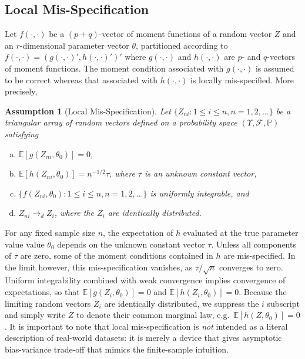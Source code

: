 \documentclass[12pt]{article}
\newcommand{\p}{\mathbb{P}}
\newcommand{\expect}{\mathbb{E}}
\newtheorem{assump}{Assumption}[section]
\theoremstyle{definition}
\begin{document}
\subsection{Local Mis-Specification}
Let $f(\cdot,\cdot)$ be a $(p+q)$-vector of moment functions of a random vector $Z$ and an $r$-dimensional parameter vector $\theta$, partitioned according to $f(\cdot,\cdot) = \left(g(\cdot,\cdot)', h(\cdot,\cdot)'  \right)'$ where $g(\cdot,\cdot)$ and $h(\cdot,\cdot)$ are $p$- and $q$-vectors of moment functions. The moment condition associated with $g(\cdot,\cdot)$ is assumed to be correct whereas that associated with $h(\cdot,\cdot)$ is locally mis-specified. More precisely,
\begin{assump}[Local Mis-Specification]
\label{assump:drift}
Let $\{Z_{ni}\colon 1\leq i \leq n, n =1, 2, \hdots\}$ be a triangular array of random vectors defined on a probability space $(\Upsilon, \mathcal{F}, \p)$ satisfying
	\begin{enumerate}[(a)]
		\item $\expect[g(Z_{ni},\theta_0)] = 0$,
		\item $\expect[h(Z_{ni},\theta_0)] = n^{-1/2}\tau$, where $\tau$ is an unknown constant vector, 
		\item $\{f(Z_{ni},\theta_0)\colon 1\leq i \leq n, n = 1, 2, \hdots\}$ is uniformly integrable, and
		\item $Z_{ni} \rightarrow_dZ_i$, where the $Z_i$ are identically distributed.
	\end{enumerate}
\end{assump}
For any fixed sample size $n$, the expectation of $h$ evaluated at the true parameter value value $\theta_0$ depends on the unknown constant vector $\tau$. Unless all components of $\tau$ are zero, some of the moment conditions contained in $h$ are mis-specified. In the limit however, this mis-specification vanishes, as $\tau/\sqrt{n}$ converges to zero. Uniform integrability combined with weak convergence implies convergence of expectations, so that $\expect[g(Z_i, \theta_0)]=0$ and $\expect[h(Z_i, \theta_0)]=0$. Because the limiting random vectors $Z_i$ are identically distributed, we suppress the $i$ subscript and simply write $Z$ to denote their common marginal law, e.g.\ $\expect[h(Z,\theta_0)]=0$. It is important to note that local mis-specification is \emph{not} intended as a literal description of real-world datasets: it is merely a device that gives asymptotic bias-variance trade-off that mimics the finite-sample intuition. 
\end{document}
